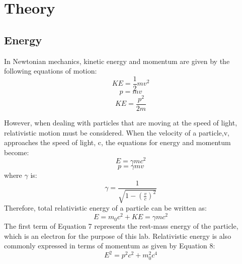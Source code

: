 \section{Theory}

\subsection{Energy}
In Newtonian mechanics, kinetic energy and momentum are given by the following equations of motion:
\begin{equation}KE= \frac{1}{2}mv^2 \end{equation}
\begin{equation} p=mv \end{equation}
\begin {equation}KE=\frac{p^2}{2m} \end{equation}

However, when dealing with particles that are moving at the speed of light, relativistic motion must be considered. When the velocity of a particle,v, approaches the speed of light, c, the equations for energy and momentum become:
\begin{equation} E=\gamma mc^2\end{equation}
\begin{equation} p=\gamma mv\end{equation}
where $\gamma$ is:
\begin{equation} \gamma= \frac{1}{\sqrt{1-(\frac{v}{c})^2}}\end{equation}
Therefore, total relativistic energy of a particle can be written as:
\begin{equation} E=m_0c^2+KE=\gamma mc^2\end{equation}
The first term of Equation 7 represents the rest-mass energy of the particle, which is an electron for the purpose of this lab. Relativistic energy is also commonly expressed in terms of momentum as given by Equation 8:
\begin{equation}E^2=p^2c^2+m_0^2c^4\end{equation}
